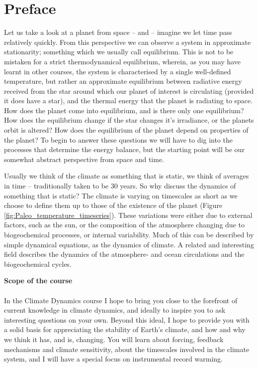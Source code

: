 \documentclass[12pt]{book}
\title{\DocTitle}
\author{Thorsten Mauritsen}
\date{\today}
\begin{document}
 
\maketitle
\tableofcontents

\frontmatter
\chapter{Preface}
Let us take a look at a planet from space -- and -- imagine we let time pass relatively quickly. From this perspective we can observe a system in approximate stationarity; something which we usually call equilibrium. This is not to be mistaken for a strict thermodynamical equilibrium, wherein, as you may have learnt in other courses, the system is characterised by a single well-defined temperature, but rather an approximate equilibrium between radiative energy received from the star around which our planet of interest is circulating (provided it does have a star), and the thermal energy that the planet is radiating to space. How does the planet come into equilibrium, and is there only one equilibrium? How does the equilibrium change if the star changes it's irradiance, or the planets orbit is altered? How does the equilibrium of the planet depend on properties of the planet? To begin to answer these questions we will have to dig into the processes that determine the energy balance, but the starting point will be our somewhat abstract perspective from space and time.

Usually we think of the climate as something that is static, we think of averages in time -- traditionally taken to be 30 years. So why discuss the dynamics of something that is static? The climate is varying on timescales as short as we choose to define them up to those of the existence of the planet (Figure \ref{fig:Paleo_temperature_timeseries}). These variations were either due to external factors, such as the sun, or  the composition of the atmosphere changing due to biogeochemical processes, or internal variability. Much of this can be described by simple dynamical equations, as the dynamics of climate. A related and interesting field describes the dynamics of the atmosphere- and ocean circulations and the biogeochemical cycles. 

\vspace{1.0 cm}
\noindent
{\bf \LARGE Scope of the course}
\\
\\
\noindent In the Climate Dynamics course I hope to bring you close to the forefront of current knowledge in climate dynamics, and ideally to inspire you to ask interesting questions on your own. Beyond this ideal, I hope to provide you with a solid basis for appreciating the stability of Earth's climate, and how and why we think it has, and is, changing. You will learn about forcing, feedback mechanisms and climate sensitivity, about the timescales involved in the climate system, and I will have a special focus on instrumental record warming. 
\end{document}
